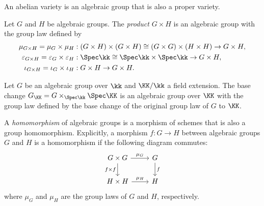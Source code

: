     \begin{example}\label{eg:abelian_varieties_as_algebraic_groups}
        An abelian variety is an algebraic group that is also a proper variety.
    \end{example}

    \begin{example}\label{eg:product_of_algebraic_groups}
        Let \(G\) and \(H\) be algebraic groups.
        The \emph{product} \(G \times H\) is an algebraic group with the group law defined by
        \begin{align*}
            \mu_{G \times H} = \mu_G \times \mu_H &: (G \times H) \times (G \times H) \cong (G \times G) \times (H \times H) \to G \times H, \\   
            \varepsilon_{G \times H} = \varepsilon_G \times \varepsilon_H &: \Spec \kk \cong \Spec \kk \times \Spec \kk \to G \times H, \\
            \iota_{G \times H} = \iota_G \times \iota_H &: G \times H \to G \times H.
        \end{align*}
    \end{example}

    \begin{example}\label{eg:base_change_of_algebraic_groups}
        Let \(G\) be an algebraic group over \(\kk\) and \(\KK/\kk\) a field extension.
        The base change \(G_\KK = G \times_{\Spec \kk} \Spec \KK\) is an algebraic group over \(\KK\) with the group law defined by the base change of the original group law of \(G\) to \(\KK\).
    \end{example}

    \begin{definition}\label{def:homomorphism_of_algebraic_groups}
        A \emph{homomorphism} of algebraic groups is a morphism of schemes that is also a group homomorphism.
        Explicitly, a morphism \(f: G \to H\) between algebraic groups \(G\) and \(H\) is a homomorphism if the following diagram commutes:
        \[
            \begin{tikzcd}
                G \times G \arrow{r}{\mu_G} \arrow[d, "f\times f" swap] & G \arrow{d}{f} \\
                H \times H \arrow{r}{\mu_H} & H
            \end{tikzcd}
        \]
        where \(\mu_G\) and \(\mu_H\) are the group laws of \(G\) and \(H\), respectively.
    \end{definition}

